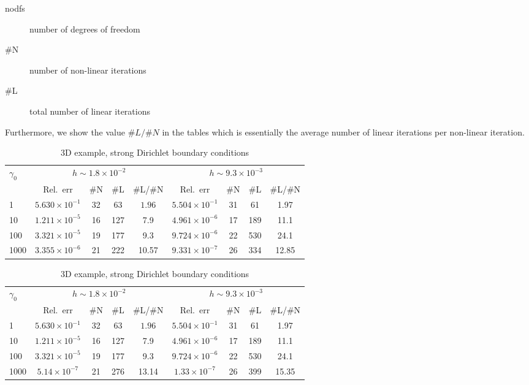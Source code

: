 \documentclass[12pt]{article}
\begin{document}
\begin{description}
\item[nodfs] number of degrees of freedom 
\item[\#N] number of non-linear iterations
\item[\#L] total number of linear iterations
\end{description}
Furthermore, we show the value $\#L/\#N$ in the tables which is essentially the average number of linear iterations per non-linear iteration.
\begin{table}   
\begin{tabular}{lcccccccc}\toprule
        $\gamma_0$ & \multicolumn{4}{c}{$h \sim 1.8 \times 10^{-2}$} & \multicolumn{4}{c}{$ h\sim9.3\times 10^{-3}$}
         \\\cmidrule(lr){2-5}\cmidrule(lr){6-9}
                    & Rel.~err &\#N& \#L & \#L/\#N& Rel.~err &\#N& \#L & \#L/\#N\\\midrule
     1 &$ 5.630 \times 10^{-1}$& 32 & 63 & $1.96$ &$5.504\times 10^{-1}$ & 31 & 61& 1.97\\
     10 & $1.211\times 10^{-5}$ & 16 & 127 & 7.9 &$4.961\times 10^{-6}$ & 17 & 189 & 11.1\\
     100  &  $3.321\times 10^{-5}$ & 19 & 177 & 9.3&  $9.724\times 10^{-6}$ & 22 & 530 & 24.1\\
     1000 & $3.355\times 10^{-6}$ & 21 & 222 & 10.57 & $9.331 \times 10^{-7}$ & 26 & 334 & 12.85 \\
         \bottomrule
         \end{tabular}
         \caption{3D example, strong Dirichlet boundary conditions}
        \end{table}
        \begin{table}   
            \begin{tabular}{lcccccccc}\toprule
                    $\gamma_0$ & \multicolumn{4}{c}{$h \sim 1.8 \times 10^{-2}$} & \multicolumn{4}{c}{$ h\sim9.3\times 10^{-3}$}
                     \\\cmidrule(lr){2-5}\cmidrule(lr){6-9}
                                & Rel.~err &\#N& \#L & \#L/\#N& Rel.~err &\#N& \#L & \#L/\#N\\\midrule
                 1 &$ 5.630 \times 10^{-1}$& 32 & 63 & $1.96$ &$5.504\times 10^{-1}$ & 31 & 61& 1.97\\
                 10 & $1.211\times 10^{-5}$ & 16 & 127 & 7.9 &$4.961\times 10^{-6}$ & 17 & 189 & 11.1\\
                 100  &  $3.321\times 10^{-5}$ & 19 & 177 & 9.3&  $9.724\times 10^{-6}$ & 22 & 530 & 24.1\\
                 1000 & $5.14\times 10^{-7}$ & 21 & 276 & 13.14 & $1.33 \times 10^{-7}$ & 26 & 399 & 15.35 \\
                     \bottomrule
                     \end{tabular}
                     \caption{3D example, strong Dirichlet boundary conditions}
                    \end{table}
               \FloatBarrier
\end{document}
